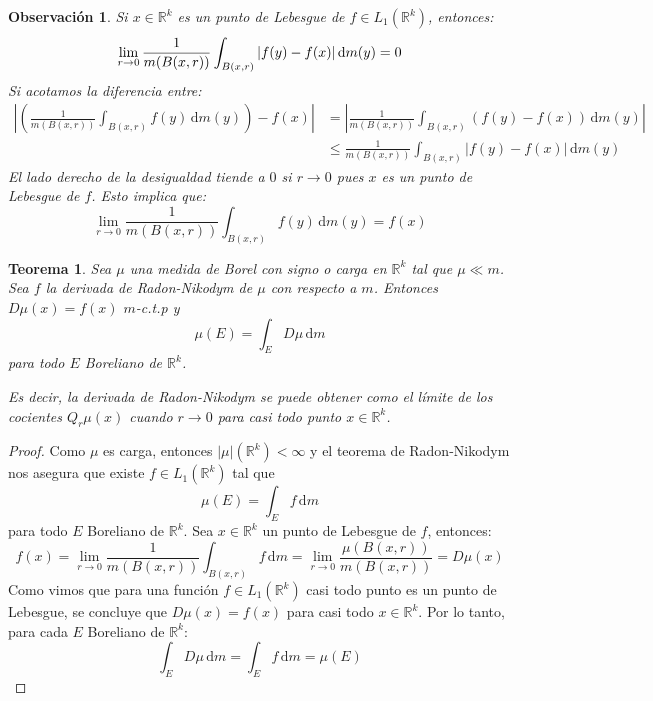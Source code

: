 \documentclass[12pt,a4paper]{article}
\theoremstyle{profesional}
\newtheorem{teorema}{Teorema}[section]
\theoremstyle{definicion-style}
\newtheorem{observacion}{Observación}[section]
\newcommand{\R}{\mathbb{R}}
\begin{document}
\begin{observacion}\label{obs:promedios-lebesgue}
    Si \( x \in \R^k \) es un punto de Lebesgue de \( f \in L_1(\R^k) \), entonces:\[
        \lim_{r \to 0} \frac{1}{m(B(x, r))} \int_{B(x, r)} |f(y) - f(x)| \, \mathrm{d} m(y) = 0 \\
    \]
    Si acotamos la diferencia entre:\begin{align*}
        \left | \left( \frac{1}{m(B(x, r))} \int_{B(x, r)} f(y) \, \mathrm{d} m(y) \right) - f(x) \right | & = \left | \frac{1}{m(B(x, r))} \int_{B(x, r)} (f(y) - f(x)) \, \mathrm{d} m(y) \right | \\
                                                                                                           & \leq \frac{1}{m(B(x, r))} \int_{B(x, r)} |f(y) - f(x)| \, \mathrm{d} m(y)
    \end{align*}
    El lado derecho de la desigualdad tiende a \( 0 \) si \( r \to 0 \) pues \( x \) es un punto de Lebesgue de \( f \). Esto implica que:\[
        \lim_{r \to 0} \frac{1}{m(B(x, r))} \int_{B(x, r)} f(y) \, \mathrm{d} m(y) = f(x)
    \]
\end{observacion}

\begin{teorema}\label{thm:radon-nikodym}
    Sea \( \mu \) una medida de Borel con signo o carga en \( \R^k \) tal que \( \mu \ll m \). Sea \( f \) la derivada de Radon-Nikodym de \( \mu \) con respecto a \( m \).
    Entonces \( D \mu(x) = f(x) \) \( m \)-c.t.p y \[
        \mu(E) = \int_E D \mu \, \mathrm{d} m
    \]
    para todo \( E \) Boreliano de \( \R^k \).

    Es decir, la derivada de Radon-Nikodym se puede obtener como el límite de los cocientes \( Q_r \mu(x) \) cuando \( r \to 0 \) para casi todo punto \( x \in \R^k \).
\end{teorema}
\begin{proof}
    Como \( \mu \) es carga, entonces \( |\mu|(\R^k) < \infty \) y el teorema de Radon-Nikodym nos asegura que existe \( f \in L_1(\R^k) \) tal que \[
        \mu(E) = \int_E f \, \mathrm{d} m
    \]
    para todo \( E \) Boreliano de \( \R^k \). Sea \( x \in \R^k \) un punto de Lebesgue de \( f \), entonces:\[
        f(x) = \lim_{r \to 0} \frac{1}{m(B(x, r))} \int_{B(x, r)} f \, \mathrm{d} m = \lim_{r \to 0} \frac{\mu(B(x, r))}{m(B(x, r))} = D \mu(x)
    \]
    Como vimos que para una función \( f \in L_1(\R^k) \) casi todo punto es un punto de Lebesgue, se concluye que \( D \mu(x) = f(x) \) para casi todo \( x \in \R^k \). Por lo tanto, para cada \( E \) Boreliano de \( \R^k \):\[
        \int_E D \mu \, \mathrm{d} m = \int_E f \, \mathrm{d} m = \mu(E)
    \]
\end{proof}
\end{document}
